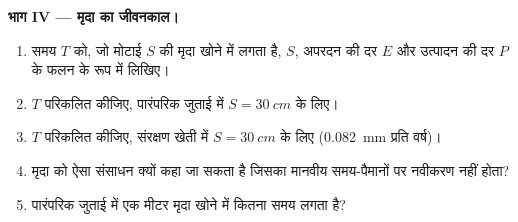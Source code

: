 \begin{problem}[{सप्ताहांत समस्या --- चट्टान से खेत तक और वापस नदी तक}]
\medskip
\noindent\textbf{भाग IV --- मृदा का जीवनकाल।}
\begin{enumerate}[resume]
  \item समय $T$ को, जो मोटाई $S$ की मृदा खोने में लगता है,
        $S$, अपरदन की दर $E$ और उत्पादन की दर $P$ के फलन के रूप में लिखिए।
  \item $T$ परिकलित कीजिए, पारंपरिक जुताई में $S = \qty{30}{cm}$ के लिए।
  \item $T$ परिकलित कीजिए, संरक्षण खेती में $S = \qty{30}{cm}$ के लिए
        (\qty{0.082}{mm} प्रति वर्ष)।
  \item मृदा को ऐसा संसाधन क्यों कहा जा सकता है जिसका मानवीय
        समय-पैमानों पर नवीकरण नहीं होता?
  \item पारंपरिक जुताई में एक मीटर मृदा खोने में कितना समय लगता है?
\end{enumerate}
\end{problem}

